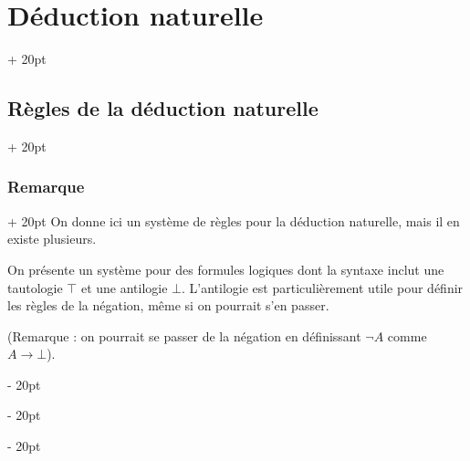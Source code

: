 \documentclass[a4paper, 12pt, twoside]{article}
\newcommand{\ind}[1][20pt]{\advance\leftskip + #1}
\newcommand{\deind}[1][20pt]{\advance\leftskip - #1}
\newenvironment{indt}[2][20pt]{#2 \par \ind[#1]}{\par \deind} %
\begin{document}
    \vspace{12pt}
    
    \begin{indt}{\section{Déduction naturelle}}
        \begin{indt}{\subsection{Règles de la déduction naturelle}}
            \begin{indt}{\subsubsection{Remarque}}
                On donne ici un système de règles pour la déduction naturelle, mais il en existe plusieurs.

                On présente un système pour des formules logiques dont la syntaxe inclut une tautologie $\top$ et une antilogie $\bot$.
                L'antilogie est particulièrement utile pour définir les règles de la négation, même si on pourrait s'en passer.

                (Remarque : on pourrait se passer de la négation en définissant $\neg A$ comme $A \rightarrow \bot$).
            \end{indt}
        \end{indt}
    \end{indt}
    
\end{document}
